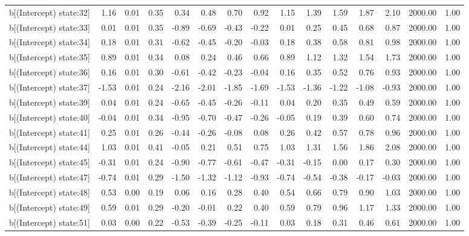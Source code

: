 \begin{table}[ht]
\begin{tabular}{rrrrrrrrrrrrrrr}
  b[(Intercept) state:32] & 1.16 & 0.01 & 0.35 & 0.34 & 0.48 & 0.70 & 0.92 & 1.15 & 1.39 & 1.59 & 1.87 & 2.10 & 2000.00 & 1.00 \\ 
  b[(Intercept) state:33] & 0.01 & 0.01 & 0.35 & -0.89 & -0.69 & -0.43 & -0.22 & 0.01 & 0.25 & 0.45 & 0.68 & 0.87 & 2000.00 & 1.00 \\ 
  b[(Intercept) state:34] & 0.18 & 0.01 & 0.31 & -0.62 & -0.45 & -0.20 & -0.03 & 0.18 & 0.38 & 0.58 & 0.81 & 0.98 & 2000.00 & 1.00 \\ 
  b[(Intercept) state:35] & 0.89 & 0.01 & 0.34 & 0.08 & 0.24 & 0.46 & 0.66 & 0.89 & 1.12 & 1.32 & 1.54 & 1.73 & 2000.00 & 1.00 \\ 
  b[(Intercept) state:36] & 0.16 & 0.01 & 0.30 & -0.61 & -0.42 & -0.23 & -0.04 & 0.16 & 0.35 & 0.52 & 0.76 & 0.93 & 2000.00 & 1.00 \\ 
  b[(Intercept) state:37] & -1.53 & 0.01 & 0.24 & -2.16 & -2.01 & -1.85 & -1.69 & -1.53 & -1.36 & -1.22 & -1.08 & -0.93 & 2000.00 & 1.00 \\ 
  b[(Intercept) state:39] & 0.04 & 0.01 & 0.24 & -0.65 & -0.45 & -0.26 & -0.11 & 0.04 & 0.20 & 0.35 & 0.49 & 0.59 & 2000.00 & 1.00 \\ 
  b[(Intercept) state:40] & -0.04 & 0.01 & 0.34 & -0.95 & -0.70 & -0.47 & -0.26 & -0.05 & 0.19 & 0.39 & 0.60 & 0.74 & 2000.00 & 1.00 \\ 
  b[(Intercept) state:41] & 0.25 & 0.01 & 0.26 & -0.44 & -0.26 & -0.08 & 0.08 & 0.26 & 0.42 & 0.57 & 0.78 & 0.96 & 2000.00 & 1.00 \\ 
  b[(Intercept) state:44] & 1.03 & 0.01 & 0.41 & -0.05 & 0.21 & 0.51 & 0.75 & 1.03 & 1.31 & 1.56 & 1.86 & 2.08 & 2000.00 & 1.00 \\ 
  b[(Intercept) state:45] & -0.31 & 0.01 & 0.24 & -0.90 & -0.77 & -0.61 & -0.47 & -0.31 & -0.15 & 0.00 & 0.17 & 0.30 & 2000.00 & 1.00 \\ 
  b[(Intercept) state:47] & -0.74 & 0.01 & 0.29 & -1.50 & -1.32 & -1.12 & -0.93 & -0.74 & -0.54 & -0.38 & -0.17 & -0.03 & 2000.00 & 1.00 \\ 
  b[(Intercept) state:48] & 0.53 & 0.00 & 0.19 & 0.06 & 0.16 & 0.28 & 0.40 & 0.54 & 0.66 & 0.79 & 0.90 & 1.03 & 2000.00 & 1.00 \\ 
  b[(Intercept) state:49] & 0.59 & 0.01 & 0.29 & -0.20 & -0.01 & 0.22 & 0.40 & 0.59 & 0.79 & 0.96 & 1.17 & 1.33 & 2000.00 & 1.00 \\ 
  b[(Intercept) state:51] & 0.03 & 0.00 & 0.22 & -0.53 & -0.39 & -0.25 & -0.11 & 0.03 & 0.18 & 0.31 & 0.46 & 0.61 & 2000.00 & 1.00 \\ 

\end{tabular}
\end{table}
